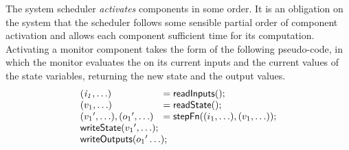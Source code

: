 The system scheduler \emph{activates} components in some order. It is
an obligation on the system that the scheduler follows some sensible
partial order of component activation and allows each component
sufficient time for its computation.  Activating a monitor component
takes the form of the following pseudo-code, in which the monitor
evaluates the  on its current inputs and the current
values of the state variables, returning the new state and the output
values.
\[
\begin{array}{ll}
 \mathit{(i_1,\ldots)} & = \konst{readInputs}(); \\
 (v_1,\ldots) & = \konst{readState}() ; \\
 ({v_1}',\ldots), ({o_1}',\ldots) & = \konst{stepFn} ((i_1,\ldots),(v_1,\ldots)) ; \\
 \multicolumn{2}{l}{\konst{writeState}({v_1}',\ldots);} \\
 \multicolumn{2}{l}{\konst{writeOutputs}({o_1}'\ldots);} \\
\end{array}
\]





